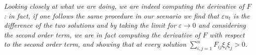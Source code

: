 \begin{oss}
	{\em Looking closely at what we are doing, we are indeed computing the derivative of $F$: in fact, if one follows the same procedure in our scenario we find that $\varepsilon u_t$ is the difference of the two solutions and by taking the limit for $\varepsilon\rightarrow 0$ and considering the second order term, we are in fact computing the derivative of $F$ with respect to the second order term, and showing that at every solution $\sum_{i, j=1}^n F_{ij}\xi_i\xi_j >0$.}
\end{oss}
\begin{comment}
	contenuto...
If one considers the F which are linear in the $\kappa_{i}$, this yields:  

\begin{align*}
	\frac{\partial Y_t}{\partial t} &= \left(\frac{\partial F}{\partial\kappa_{i}} \kappa_{i} \right)\nu\\
	\frac{\partial Y_t}{\partial t} &= \frac{\partial F}{\partial\kappa_{i}} o^{ik} h_{kl}o^{li}\,\nu \\ 
	\frac{\partial Y_t}{\partial t} &= \frac{\partial F}{\partial\kappa_{i}}   o^{ik}o^{li}\left\langle \frac{\partial^2 Y_t}{\partial x_k\partial x_l} , \nu \right\rangle \,\nu + \text{lower order terms}
\end{align*}
implying summation convention, for an appropriate orthogonal matrix $o_{li}$ that makes $h_{ij}$ diagonal, which makes the equation parabolic if $\frac{\partial F}{\partial \kappa_i}$ is positive. 

{\vspace{10pt}\LARGE \bf [NEED HELP WITH PARABOLICITY!]}

In \cite{huisken}, the paper considers F as a function of the second fundamental form $h_{ij}$, as the principal curvatures are themselves function of it. The following is then said, speaking about "linearisation", while also citing the Weingarten equations:
\begin{align*}
	\frac{\partial Y_t}{\partial t} &= \frac{\partial F}{\partial h_{i j}} g^{i k}g^{jl}h_{k l} \nu+ \mathrm{lower \ order \ terms}\\
	\frac{\partial Y_t}{\partial t} &= \frac{\partial F}{\partial h_{i j}} g^{i k}g^{jl}\left\langle \frac{\partial^2 Y_t}{\partial x_k\partial x_l} , \nu \right\rangle \nu+ \mathrm{lower \ order \ terms}
\end{align*}
Which I did not understand the implication of (especially with respect to maximum principle - there is probably something I am missing due to non-linearity of the equation). 

\begin{theorem}[Parabolicity of the differential equation (\ref{evolutioneq})]
	da scrivere\label{graphparabolic}
\end{theorem}

Il conto probabilmente è quello in \cite{hamilton}, pagina 262. Info sul nostro caso sono in \cite{huisken}, pagina 50. 

{\vspace{10pt}\LARGE \bf [NEED HELP!]}

\end{comment}

